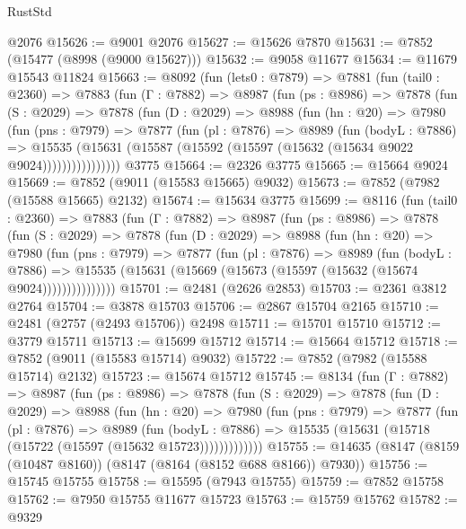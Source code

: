 \begin{lexlean}{RustStd}
\begin{coremodule}
    @2076
@15626 := @9001 @2076
@15627 := @15626 @7870
@15631 := @7852 (@15477 (@8998 (@9000 @15627)))
@15632 := @9058 @11677
@15634 := @11679 @15543 @11824
@15663 := @8092
    (fun (lets0 : @7879) =>
    @7881
      (fun (tail0 : @2360) =>
      @7883
        (fun (Γ : @7882) =>
        @8987
          (fun (ps : @8986) =>
          @7878
            (fun (S : @2029) =>
            @7878
              (fun (D : @2029) =>
              @8988
                (fun (hn : @20) =>
                @7980
                  (fun (pns : @7979) =>
                  @7877
                    (fun (pl : @7876) =>
                    @8989
                      (fun (bodyL : @7886) =>
                      @15535
                        (@15631 (@15587 (@15592 (@15597 (@15632 (@15634 @9022 @9024))))))))))))))))
    @3775
@15664 := @2326 @3775
@15665 := @15664 @9024
@15669 := @7852 (@9011 (@15583 @15665) @9032)
@15673 := @7852 (@7982 (@15588 @15665) @2132)
@15674 := @15634 @3775
@15699 := @8116
    (fun (tail0 : @2360) =>
    @7883
      (fun (Γ : @7882) =>
      @8987
        (fun (ps : @8986) =>
        @7878
          (fun (S : @2029) =>
          @7878
            (fun (D : @2029) =>
            @8988
              (fun (hn : @20) =>
              @7980
                (fun (pns : @7979) =>
                @7877
                  (fun (pl : @7876) =>
                  @8989
                    (fun (bodyL : @7886) =>
                    @15535 (@15631 (@15669 (@15673 (@15597 (@15632 (@15674 @9024)))))))))))))))
@15701 := @2481 (@2626 @2853)
@15703 := @2361 @3812 @2764
@15704 := @3878 @15703
@15706 := @2867 @15704 @2165
@15710 := @2481 (@2757 (@2493 @15706)) @2498
@15711 := @15701 @15710
@15712 := @3779 @15711
@15713 := @15699 @15712
@15714 := @15664 @15712
@15718 := @7852 (@9011 (@15583 @15714) @9032)
@15722 := @7852 (@7982 (@15588 @15714) @2132)
@15723 := @15674 @15712
@15745 := @8134
    (fun (Γ : @7882) =>
    @8987
      (fun (ps : @8986) =>
      @7878
        (fun (S : @2029) =>
        @7878
          (fun (D : @2029) =>
          @8988
            (fun (hn : @20) =>
            @7980
              (fun (pns : @7979) =>
              @7877
                (fun (pl : @7876) =>
                @8989
                  (fun (bodyL : @7886) =>
                  @15535 (@15631 (@15718 (@15722 (@15597 (@15632 @15723)))))))))))))
@15755 := @14635 (@8147 (@8159 (@10487 @8160)) (@8147 (@8164 (@8152 @688 @8166)) @7930))
@15756 := @15745 @15755
@15758 := @15595 (@7943 @15755)
@15759 := @7852 @15758
@15762 := @7950 @15755 @11677 @15723
@15763 := @15759 @15762
@15782 := @9329

\end{coremodule}
\end{lexlean}
